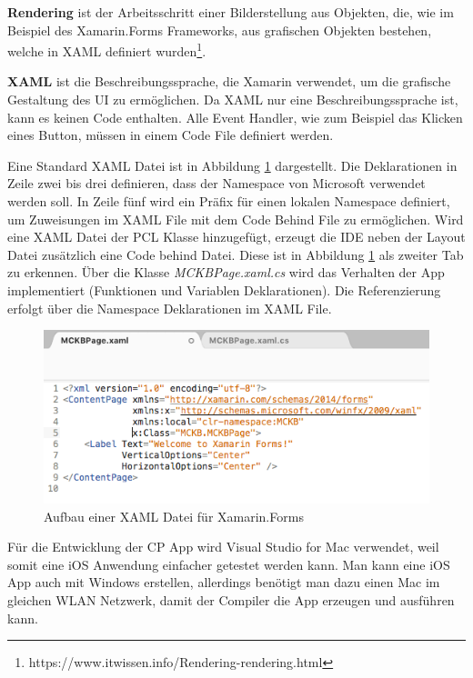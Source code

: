 	\textbf{Rendering} ist der Arbeitsschritt einer Bilderstellung aus Objekten, die, wie im Beispiel des Xamarin.Forms Frameworks, aus grafischen Objekten bestehen, welche in XAML definiert wurden\footnote{https://www.itwissen.info/Rendering-rendering.html}.

	\textbf{XAML} ist die Beschreibungssprache, die Xamarin verwendet, um die grafische Gestaltung des UI zu ermöglichen. Da XAML nur eine Beschreibungssprache ist, kann es keinen Code enthalten. Alle Event Handler, wie zum Beispiel das Klicken eines Button, müssen in einem Code File definiert werden.

	\newpage
	Eine Standard XAML Datei ist in Abbildung \ref{fig:xamarinaformxamlpreview} dargestellt. Die Deklarationen in Zeile zwei bis drei definieren, dass der Namespace von Microsoft verwendet werden soll. In Zeile fünf wird ein Präfix für einen lokalen Namespace definiert, um Zuweisungen im XAML File mit dem Code Behind File zu ermöglichen. Wird eine XAML Datei der PCL Klasse hinzugefügt, erzeugt die IDE neben der Layout Datei zusätzlich eine Code behind Datei. Diese ist in Abbildung \ref{fig:xamarinaformxamlpreview} als zweiter Tab zu erkennen. Über die Klasse \textit{MCKBPage.xaml.cs} wird das Verhalten der App implementiert (Funktionen und Variablen Deklarationen). Die Referenzierung erfolgt über die Namespace Deklarationen im XAML File.

	\begin{figure}[h!]
		\centering
		\includegraphics[width=1\textwidth]{images/XAML-preview.png}
		\caption[Aufbau einer XAML Datei für Xamarin.Forms]{Aufbau einer XAML Datei für Xamarin.Forms}
		\label{fig:xamarinaformxamlpreview}
	\end{figure}

	Für die Entwicklung der CP App wird Visual Studio for Mac verwendet, weil somit eine iOS Anwendung einfacher getestet werden kann. Man kann eine iOS App auch mit Windows erstellen, allerdings benötigt man dazu einen Mac im gleichen WLAN Netzwerk, damit der Compiler die App erzeugen und ausführen kann.

